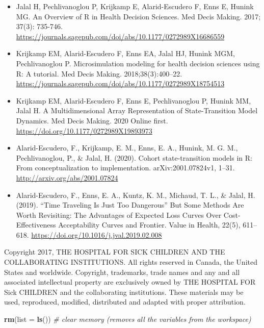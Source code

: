 \documentclass[
]{article}
\newenvironment{Shaded}{\begin{snugshade}}{\end{snugshade}}
\newcommand{\CommentTok}[1]{\textcolor[rgb]{0.56,0.35,0.01}{\textit{#1}}}
\newcommand{\DataTypeTok}[1]{\textcolor[rgb]{0.13,0.29,0.53}{#1}}
\newcommand{\KeywordTok}[1]{\textcolor[rgb]{0.13,0.29,0.53}{\textbf{#1}}}
\newcommand{\NormalTok}[1]{#1}
\begin{document}
\begin{itemize}
\item
  Jalal H, Pechlivanoglou P, Krijkamp E, Alarid-Escudero F, Enns E,
  Hunink MG. An Overview of R in Health Decision Sciences. Med Decis
  Making. 2017; 37(3): 735-746.
  \url{https://journals.sagepub.com/doi/abs/10.1177/0272989X16686559}
\item
  Krijkamp EM, Alarid-Escudero F, Enns EA, Jalal HJ, Hunink MGM,
  Pechlivanoglou P. Microsimulation modeling for health decision
  sciences using R: A tutorial. Med Decis Making. 2018;38(3):400--22.
  \url{https://journals.sagepub.com/doi/abs/10.1177/0272989X18754513}
\item
  Krijkamp EM, Alarid-Escudero F, Enns E, Pechlivanoglou P, Hunink MM,
  Jalal H. A Multidimensional Array Representation of State-Transition
  Model Dynamics. Med Decis Making. 2020 Online first.
  \url{https://doi.org/10.1177/0272989X19893973}
\item
  Alarid-Escudero, F., Krijkamp, E. M., Enns, E. A., Hunink, M. G. M.,
  Pechlivanoglou, P., \& Jalal, H. (2020). Cohort state-transition
  models in R: From conceptualization to implementation.
  arXiv:2001.07824v1, 1--31. \url{http://arxiv.org/abs/2001.07824}
\item
  Alarid-Escudero, F., Enns, E. A., Kuntz, K. M., Michaud, T. L., \&
  Jalal, H. (2019). ``Time Traveling Is Just Too Dangerous'' But Some
  Methods Are Worth Revisiting: The Advantages of Expected Loss Curves
  Over Cost-Effectiveness Acceptability Curves and Frontier. Value in
  Health, 22(5), 611--618.
  \url{https://doi.org/10.1016/j.jval.2019.02.008}
\end{itemize}

Copyright 2017, THE HOSPITAL FOR SICK CHILDREN AND THE COLLABORATING
INSTITUTIONS. All rights reserved in Canada, the United States and
worldwide. Copyright, trademarks, trade names and any and all associated
intellectual property are exclusively owned by THE HOSPITAL FOR Sick
CHILDREN and the collaborating institutions. These materials may be
used, reproduced, modified, distributed and adapted with proper
attribution.

\newpage

\begin{Shaded}
\begin{Highlighting}[]
\KeywordTok{rm}\NormalTok{(}\DataTypeTok{list =} \KeywordTok{ls}\NormalTok{())      }\CommentTok{# clear memory (removes all the variables from the workspace)}
\end{Highlighting}
\end{Shaded}
\end{document}
